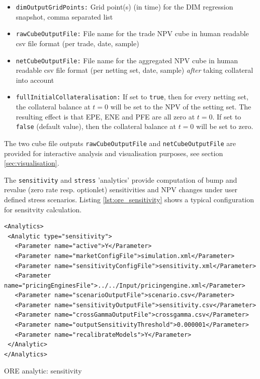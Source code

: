 \documentclass[12pt, a4paper]{article}
\begin{document}
\begin{itemize}
\item {\tt dimOutputGridPoints:} Grid point(s) (in time) for the DIM regression snapshot, comma separated list
\item {\tt rawCubeOutputFile:} File name for the trade NPV cube in human readable csv file format (per trade, date,
sample)
\item {\tt netCubeOutputFile:} File name for the aggregated NPV cube in human readable csv file format (per netting set,
date, sample) {\em after} taking collateral into account
\item {\tt fullInitialCollateralisation:} If set to {\tt true}, then for every netting set, the collateral balance at $t=0$ will be set to the NPV of the setting set. The resulting effect is that EPE, ENE and PFE are all zero at $t=0$. If set to {\tt false} (default value), then the collateral balance at $t=0$ will be set to zero.
\end{itemize}

The two cube file outputs {\tt rawCubeOutputFile} and {\tt netCubeOutputFile} are provided for interactive analysis and visualisation purposes, see section
\ref{sec:visualisation}.

\medskip The {\tt sensitivity} and {\tt stress} 'analytics' provide computation of bump and revalue (zero rate
resp. optionlet) sensitivities and NPV changes under user defined stress scenarios. Listing \ref{lst:ore_sensitivity}
shows a typical configuration for sensitvity calculation.

\begin{listing}[H]
\begin{verbatim}
<Analytics>
 <Analytic type="sensitivity">
   <Parameter name="active">Y</Parameter>
   <Parameter name="marketConfigFile">simulation.xml</Parameter>
   <Parameter name="sensitivityConfigFile">sensitivity.xml</Parameter>
   <Parameter name="pricingEnginesFile">../../Input/pricingengine.xml</Parameter>
   <Parameter name="scenarioOutputFile">scenario.csv</Parameter>
   <Parameter name="sensitivityOutputFile">sensitivity.csv</Parameter>
   <Parameter name="crossGammaOutputFile">crossgamma.csv</Parameter>
   <Parameter name="outputSensitivityThreshold">0.000001</Parameter>
   <Parameter name="recalibrateModels">Y</Parameter>
 </Analytic>
</Analytics>
\end{verbatim}
\caption{ORE analytic: sensitivity}
\label{lst:ore_sensitivity}
\end{listing}
\end{document}
